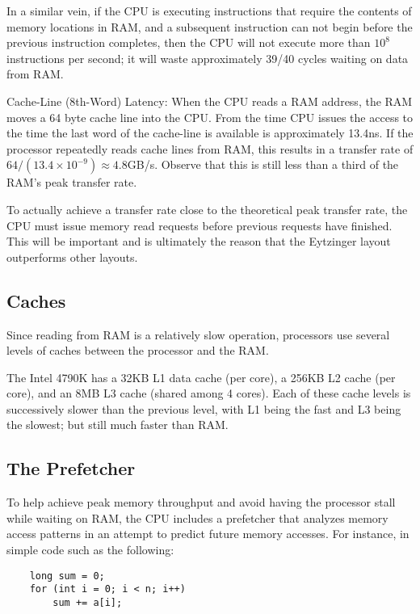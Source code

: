 \documentclass{patmorin}
\begin{document}
In a similar vein, if the CPU is executing instructions that require
the contents of memory locations in RAM, and a subsequent instruction
can not begin before the previous instruction completes, then the CPU
will not execute more than $10^8$ instructions per second; it will waste
approximately 39/40 cycles waiting on data from RAM.

Cache-Line (8th-Word) Latency:  When the CPU reads a RAM address, the
RAM moves a 64 byte cache line into the CPU. From the time CPU issues
the access to the time the last word of the cache-line is available is
approximately 13.4ns.  If the processor repeatedly reads cache lines
from RAM, this results in a transfer rate of $64 / (13.4\times10^{-9})
\approx 4.8$GB/s.  Observe that this is still less than a third of the
RAM's peak transfer rate.

To actually achieve a transfer rate close to the theoretical peak transfer
rate, the CPU must issue memory read requests before previous requests
have finished. This will be important and is ultimately the reason that
the Eytzinger layout outperforms other layouts.

\subsection{Caches}

Since reading from RAM is a relatively slow operation, processors use
several levels of caches between the processor and the RAM.

The Intel 4790K has a 32KB L1 data cache (per core), a 256KB L2 cache
(per core), and an 8MB L3 cache (shared among 4 cores).  Each of these
cache levels is successively slower than the previous level, with L1 being
the fast and L3 being the slowest; but still much faster than RAM.

\subsection{The Prefetcher}

To help achieve peak memory throughput and avoid having the processor
stall while waiting on RAM, the CPU includes a prefetcher that analyzes
memory access patterns in an attempt to predict future memory accesses.
For instance, in simple code such as the following:

\begin{verbatim}
    long sum = 0;
    for (int i = 0; i < n; i++) 
        sum += a[i];
\end{verbatim}
\end{document}
